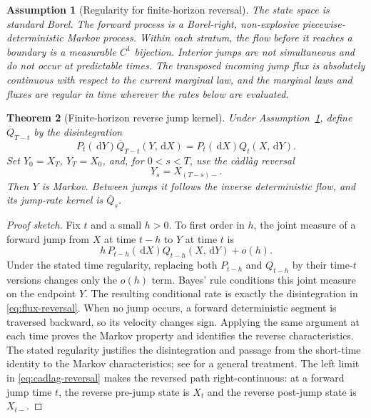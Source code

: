 \documentclass[10pt]{article}
\newtheorem{theorem}{Theorem}[section]
\newtheorem{assumption}[theorem]{Assumption}
\theoremstyle{definition}
\theoremstyle{remark}
\newcommand{\dd}{\,\mathrm{d}}
\begin{document}
\begin{assumption}[Regularity for finite-horizon reversal]
\label{ass:reversal-regularity}
The state space is standard Borel.  The forward process is a Borel-right,
non-explosive piecewise-deterministic Markov process.  Within each stratum,
the flow before it reaches a boundary is a measurable $C^1$ bijection.
Interior jumps are not simultaneous and do not occur at predictable times.
The transposed incoming jump flux is absolutely continuous with respect to
the current marginal law, and the marginal laws and fluxes are regular in
time wherever the rates below are evaluated.
\end{assumption}

\begin{theorem}[Finite-horizon reverse jump kernel]
\label{thm:reverse-kernel}
Under Assumption~\ref{ass:reversal-regularity}, define
$\overline Q_{T-t}$ by the disintegration
\begin{equation}
  P_t(\dd Y)\overline Q_{T-t}(Y,\dd X)
  =P_t(\dd X)Q_t(X,\dd Y).
  \label{eq:flux-reversal}
\end{equation}
Set $Y_0=X_T$, $Y_T=X_0$, and, for $0<s<T$, use the c\`adl\`ag
reversal
\begin{equation}
  Y_s=X_{(T-s)-}.
  \label{eq:cadlag-reversal}
\end{equation}
Then $Y$ is Markov.  Between jumps it follows the inverse deterministic
flow, and its jump-rate kernel is $\overline Q_s$.
\end{theorem}

\begin{proof}[Proof sketch]
Fix $t$ and a small $h>0$.  To first order in $h$, the joint measure of a forward jump from $X$ at time $t-h$ to $Y$ at time $t$ is
\[
  h\,P_{t-h}(\dd X)Q_{t-h}(X,\dd Y)+o(h).
\]
Under the stated time regularity, replacing both $P_{t-h}$ and $Q_{t-h}$
by their time-$t$ versions changes only the $o(h)$ term.  Bayes' rule
conditions this joint measure on the endpoint $Y$.  The resulting
conditional rate is exactly the disintegration in
\eqref{eq:flux-reversal}.  When no jump occurs, a forward deterministic
segment is traversed backward, so its velocity changes sign.  Applying the
same argument at each time proves the Markov property and identifies the
reverse characteristics.
The stated regularity justifies the disintegration and passage from the
short-time identity to the Markov characteristics; see
\cite{conforti2022time} for a general treatment.  The left limit in
\eqref{eq:cadlag-reversal} makes the reversed path right-continuous: at a
forward jump time $t$, the reverse pre-jump state is $X_t$ and the reverse
post-jump state is $X_{t-}$.
\end{proof}
\end{document}
